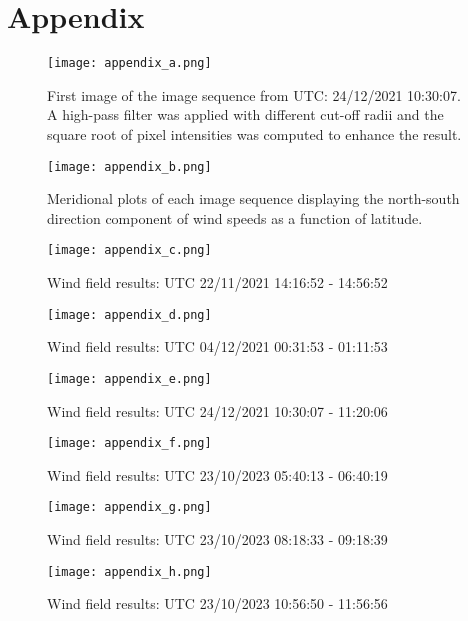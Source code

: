 \chapter{Appendix\label{chap:appendix}}

\begin{figure}[h!]
    \centering
    \texttt{[image: appendix\_a.png]}
    \caption{First image of the image sequence from UTC: 24/12/2021 10:30:07. A high-pass filter was applied with different cut-off radii and the square root of pixel intensities was computed to enhance the result.}
\end{figure}
\FloatBarrier
\begin{figure}[h!]
    \centering
    \texttt{[image: appendix\_b.png]}
    \caption{Meridional plots of each image sequence displaying the north-south direction component of wind speeds as a function of latitude.}
\end{figure}
\FloatBarrier
\begin{figure}[h!]
    \centering
    \texttt{[image: appendix\_c.png]}
    \caption{Wind field results: UTC 22/11/2021 14:16:52 - 14:56:52}
\end{figure}
\FloatBarrier
\begin{figure}[h!]
    \centering
    \texttt{[image: appendix\_d.png]}
    \caption{Wind field results: UTC 04/12/2021 00:31:53 - 01:11:53}
\end{figure}
\FloatBarrier
\begin{figure}[h!]
    \centering
    \texttt{[image: appendix\_e.png]}
    \caption{Wind field results: UTC 24/12/2021 10:30:07 - 11:20:06}
\end{figure}
\FloatBarrier
\begin{figure}[h!]
    \centering
    \texttt{[image: appendix\_f.png]}
    \caption{Wind field results: UTC 23/10/2023 05:40:13 - 06:40:19}
\end{figure}
\FloatBarrier
\begin{figure}[h!]
    \centering
    \texttt{[image: appendix\_g.png]}
    \caption{Wind field results: UTC 23/10/2023 08:18:33 - 09:18:39}
\end{figure}
\FloatBarrier
\begin{figure}[h!]
    \centering
    \texttt{[image: appendix\_h.png]}
    \caption{Wind field results: UTC 23/10/2023 10:56:50 - 11:56:56}
\end{figure}